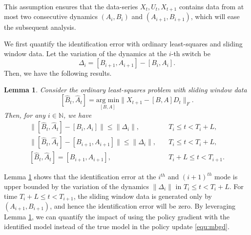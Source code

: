\documentclass[letterpaper, 10 pt, conference]{ieeeconf}  %
\newtheorem{lemma}{Lemma}
\begin{document}
This assumption ensures that the data-series $X_t, U_t, X_{t+1}$ contains data from at most two consecutive dynamics $(A_i, B_i)$ and $(A_{i+1}, B_{i+1})$, which will ease the subsequent analysis. 

We first quantify the identification error with ordinary least-squares and sliding window data. Let the variation of the dynamics at the $i$-th switch be 
$$
\Delta_i = [B_{i+1}, A_{i+1}] - [B_{i}, A_{i}].
$$
Then, we have the following results.
\begin{lemma}
\label{error_LS}
Consider the ordinary least-squares problem with sliding window data 
\begin{equation}\label{equ:ls}
    [\hat{B}_{t}, \hat{A}_{t}] = \underset{[B, A]}{\text{arg min}} \| X_{t+1} - [B,A]D_t
    \|_F.
\end{equation} 
Then, for any $i \in \mathbb{N}$, we have
\begin{equation*}
\begin{aligned}
    \|[\hat{B}_{t}, \hat{A}_{t}] - [B_{i}, A_{i}]\| \leq \|\Delta_i\|,  &\quad T_i \leq t < T_i + L, \\
    \|[\hat{B}_{t}, \hat{A}_{t}] - [B_{i+1}, A_{i+1}]\| \leq \|\Delta_i\|,   &\quad T_i \leq t < T_i + L, \\
     [\hat{B}_{t}, \hat{A}_{t}] = [B_{i+1}, A_{i+1}], &\quad T_i + L \leq t < T_{i+1}.
\end{aligned}
\end{equation*}

\end{lemma} \vspace{2mm}

Lemma \ref{error_LS} shows that the identification error at the $i^{th}$ and $(i+1)^{th}$ mode is upper bounded by the variation of the dynamics $\|\Delta_i\|$ in $T_i \leq t < T_i + L$. For time $T_i + L \leq t < T_{i+1}$, the sliding window data is generated only by $(A_{i+1}, B_{i+1})$, and hence the identification error will be zero. By leveraging Lemma \ref{error_LS}, we can quantify the impact of using the policy gradient with the identified model instead of the true model in the policy update \eqref{equ:mbgd}. 
 
\end{document}

